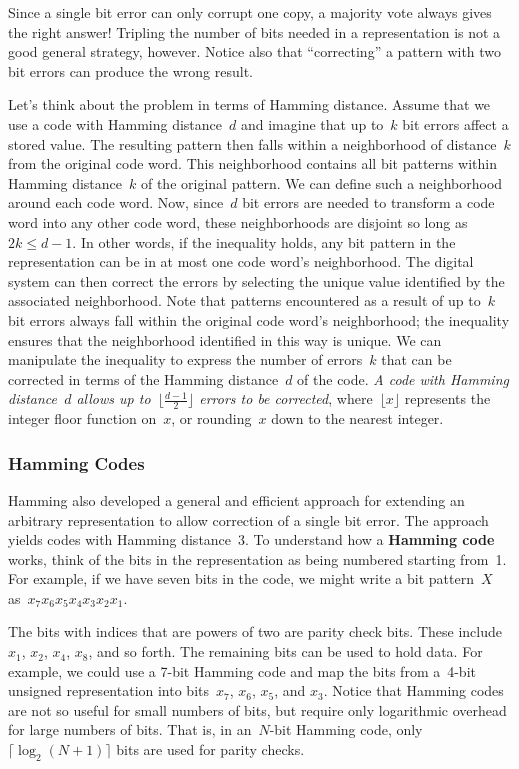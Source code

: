 Since a
single bit error can only corrupt one copy, a majority vote always
gives the right answer!
Tripling the number of bits needed in a representation is not a good
general strategy, however. 
Notice also that ``correcting'' a pattern with two bit errors can produce
the wrong result.\vspace{2pt}

Let's think about the problem in terms
of Hamming distance.  Assume that we use a code with Hamming distance~$d$
and imagine that up to~$k$ bit errors affect a stored value.
The resulting pattern then falls within a neighborhood of distance~$k$
from the original code word.  This neighborhood contains all bit 
patterns within Hamming distance~$k$ of the original pattern.
We can define such a neighborhood around each code word.  Now, 
since~$d$ bit errors are needed to transform a code word into
any other code word, these neighborhoods are disjoint so long
as~$2k\leq{d-1}$.  In other words, if the inequality holds,
any bit pattern in the representation can be in at most one code word's 
neighborhood.  The digital system can then correct the errors by 
selecting the unique value identified by the associated neighborhood.
Note that patterns encountered as a result of up to~$k$ bit errors
always fall within the original code word's neighborhood; the inequality
ensures that the neighborhood identified in this way is unique.
We can manipulate the inequality to express the number of errors~$k$ that
can be corrected in terms of the Hamming distance~$d$ of the code.
{\it A code with Hamming distance~$d$ allows up to~$\lfloor\frac{d-1}{2}\rfloor$
errors to be corrected}, where~$\lfloor{x}\rfloor$ represents the
integer floor function on~$x$, or rounding~$x$ down to the nearest 
integer.\\


\subsubsection{Hamming Codes}

Hamming also developed a general and efficient approach for 
extending an arbitrary representation to allow correction of
a single bit error.  The approach yields codes with Hamming distance~3.
%
To understand how a {\bf Hamming code} works, think of the bits in the
representation as being numbered starting from~1.  For example, if
we have seven bits in the code, we might write a bit pattern~$X$ 
as~$x_7x_6x_5x_4x_3x_2x_1$.

The bits with indices that are powers of two are parity check bits.
These include $x_1$, $x_2$, $x_4$, $x_8$, and so forth.  The remaining
bits can be used to hold data.  For example, we could use a \mbox{7-bit}
Hamming code and map the bits from a~\mbox{4-bit} unsigned representation 
into bits~$x_7$, $x_6$, $x_5$, and $x_3$.  Notice that Hamming codes are
not so useful for small numbers of bits, but require only logarithmic
overhead for large numbers of bits.  That is, in an~\mbox{$N$-bit}
Hamming code, only~$\lceil\log_2(N+1)\rceil$ bits are used for parity
checks.

